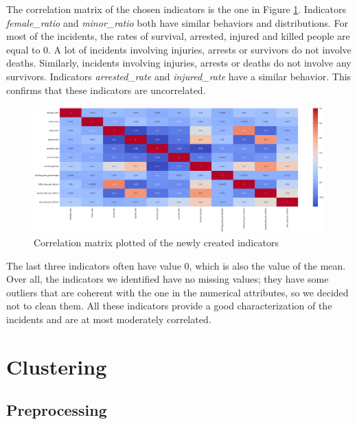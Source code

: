 \documentclass[10pt,a4paper]{report}
\begin{document}
The correlation matrix of the chosen indicators is the one in Figure \ref{corr_matrix_indicators}.
Indicators \textit{female\_ratio} and \textit{minor\_ratio} both have similar behaviors and distributions.
For most of the incidents, the rates of survival, arrested, injured and killed people are equal to 0.
A lot of incidents involving injuries, arrests or survivors do not involve deaths.
Similarly, incidents involving injuries, arrests or deaths do not involve any survivors.
Indicators \textit{arrested\_rate} and \textit{injured\_rate} have a similar behavior.
This confirms that these indicators are uncorrelated. 
\begin{figure}[h]
	\includegraphics[width=1\textwidth]{corr_matrix_indicators}
	\centering
	\caption{Correlation matrix plotted of the newly created indicators}
	\label{corr_matrix_indicators}
\end{figure}

The last three indicators often have value 0, which is also the value of the mean.
Over all, the indicators we identified have no missing values; they have some outliers that are coherent with the one in the numerical attributes, so we decided not to clean them.
All these indicators provide a good characterization of the incidents and are at most moderately correlated.

\chapter{Clustering}

\section{Preprocessing}
\end{document}
